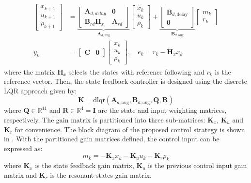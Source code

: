 \begin{align}
    \begin{aligned}
        \begin{bmatrix}
            x_{k + 1}\\
            u_{k + 1}\\
            \rho_{k + 1}
        \end{bmatrix}
        &=
        \underbrace{
        \begin{bmatrix}
            \mathbf{A}_{d,delay} & \mathbf{0} \\
            \mathbf{B}_{rd}\mathbf{H}_x & \mathbf{A}_{rd}
        \end{bmatrix}
        }_{\mathbf{A}_{d,\text{aug}}}
        \begin{bmatrix}
            x_k\\
            u_k\\
            \rho_k
        \end{bmatrix}
        +
        \underbrace{
        \begin{bmatrix}
            \mathbf{B}_{d,\text{delay}}\\
            \mathbf{0}
        \end{bmatrix}
        }_{\mathbf{B}_{d,\text{aug}}}
        \begin{bmatrix}
            m_k\\
            r_k
        \end{bmatrix}
        \\
        y_k &= 
        \begin{bmatrix}
            \mathbf{C} & \mathbf{0}
        \end{bmatrix}
        \begin{bmatrix}
            x_k\\
            u_k\\
            \rho_k
        \end{bmatrix}, \quad
        e_k = r_k - \mathbf{H}_x x_k
    \end{aligned}
\end{align}
where the matrix $\mathbf{H}_x$ selects the states with reference following and $r_k$ is the reference vector.
Then, the state feedback controller is designed using the discrete LQR approach given by:
\begin{equation}
    \mathbf{K} = \text{dlqr}(\mathbf{A}_{d,\text{aug}}, \mathbf{B}_{d,\text{aug}}, \mathbf{Q}, \mathbf{R})
\end{equation}
where $\mathbf{Q}\in\mathbb{R}^{11}$ and $\mathbf{R}\in\mathbb{R}^4 = \mathbf{I}$ are the state and input weighting matrices, respectively. The gain matrix is partitioned into three sub-matrices: $\mathbf{K}_x$, $\mathbf{K}_u$ and $\mathbf{K}_r$ for convenience. The block diagram of the proposed control strategy is shown in . With the partitioned gain matrices defined, the control input can be expressed as:
\begin{equation}
    m_k = -\mathbf{K}_x
    x_k - \mathbf{K}_u u_k - \mathbf{K}_r \rho_k
\end{equation}
where $\mathbf{K}_x$ is the state feedback gain matrix, $\mathbf{K}_u$ is the previous control input gain matrix and $\mathbf{K}_r$ is the resonant states gain matrix.

